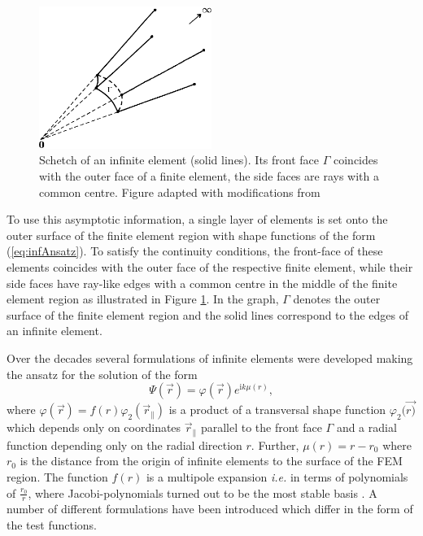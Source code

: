 \begin{figure}
\includegraphics[width=0.5\textwidth]{Figures/BC/InfElem}
\caption{Schetch of an infinite element (solid lines).
Its front face $\Gamma$ coincides with the outer face of a finite element, the side faces are rays with a common centre. 
Figure adapted with modifications from \cite{dreyer}}
\label{fig:IElem}
\end{figure}
To use this asymptotic information, a single layer of elements is set onto the outer surface of the finite element region with shape functions of the form (\ref{eq:infAnsatz}).
To satisfy the continuity conditions, the front-face of these elements coincides with the outer face of the respective finite element, while their side faces have ray-like edges with a common centre in the middle of the finite element region as illustrated in Figure \ref{fig:IElem}.
In the graph, $\Gamma$ denotes the outer surface of the finite element region and the solid lines correspond to the edges of an infinite element.

Over the decades several formulations of infinite elements were developed making the ansatz for the solution of the form
\begin{equation} \label{eq:Infansatz}
 \Psi(\vec{r}) = \varphi(\vec{r}) e^{\text{i}k\mu(r)},
\end{equation}
where $\varphi(\vec{r})=f(r)\varphi_2(\vec{r}_\parallel)$ is a product of a transversal shape function $\varphi_2(\vec{r)}$ which depends only on coordinates $\vec{r}_\parallel$ parallel to the front face $\Gamma$ and a radial function depending only on the radial direction $r$.
Further, $\mu(r)=r-r_0$ where $r_0$ is the distance from the origin of infinite elements to the surface of the FEM region.
The function $f(r)$ is a multipole expansion \textit{i.e.} in terms of polynomials of $\frac{r_0}{r}$, where Jacobi-polynomials turned out to be the most stable basis \cite{dreyer_improved, infelNew}.
A number of different formulations have been introduced which differ in the form of the test functions.


